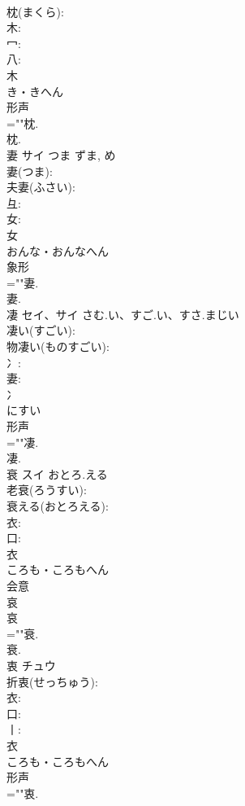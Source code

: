 \documentclass[8pt]{extreport}
\begin{document}
\begin{CJK}{UTF8}{min}
\\	枕(まくら): 
\\	木: 
\\	冖: 
\\	八: 
\\	木	
\\	き・きへん	
\\	形声 
\\	=""枕.
\\	枕.
\\	妻	サイ	つま	ずま, め	
\\	妻(つま): 
\\	夫妻(ふさい): 
\\	彑: 
\\	女: 
\\	女	
\\	おんな・おんなへん	
\\	象形 
\\	=""妻.
\\	妻.
\\	凄	セイ、サイ	さむ.い、すご.い、すさ.まじい		
\\	凄い(すごい): 
\\	物凄い(ものすごい): 
\\	冫: 
\\	妻: 
\\	冫	
\\	にすい	
\\	形声 
\\	=""凄.
\\	凄.
\\	衰	スイ	おとろ.える		
\\	老衰(ろうすい): 
\\	衰える(おとろえる): 
\\	衣: 
\\	口: 
\\	衣	
\\	ころも・ころもへん	
\\	会意 
\\	哀 
\\	哀 
\\	=""衰.
\\	衰.
\\	衷	チュウ			
\\	折衷(せっちゅう): 
\\	衣: 
\\	口: 
\\	丨: 
\\	衣	
\\	ころも・ころもへん	
\\	形声 
\\	=""衷.

\end{CJK}
\end{document}

